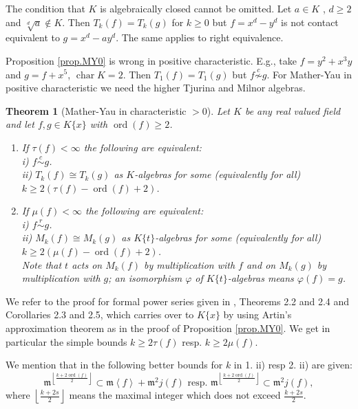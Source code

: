\documentclass[11pt]{article}
\DeclareMathOperator{\ord}{ord}
\DeclareMathOperator{\Char}{char}
\newtheorem{Theorem}[Definition]{Theorem}
\begin{document}
 {The condition that $K$ is algebraically closed cannot be omitted. Let $a \in K$ , $d \ge 2$ and $\sqrt[d]{a} \notin K$. Then  $T_k(f)=T_k(g)$ for $k\ge 0$ but
$f=x^d-y^d$ is not contact equivalent to $g=x^d-ay^d$. The same applies to right equivalence.}

Proposition \ref{prop.MY0} is wrong in positive characteristic. E.g., take $f=y^2+x^3y$ and $g=f+x^5$, $\Char K=2$. Then $T_1(f)=T_1(g)$ but $f\mathop{\not\sim}\limits^{c} g$. 
 {For Mather-Yau in positive characteristic} we need the higher Tjurina and Milnor algebras.

\begin{Theorem}[Mather-Yau in characteristic $>0$] \label{thm.MYp}
Let $K$ be any real valued field and let $f,g\in K \{x\}$ with $\ord(f) \ge 2$.
\begin{enumerate}
\item If $\tau(f)<\infty$ the following are equivalent:\\
i) $f\mathop  \sim \limits^c g$. \\
ii) $T_k(f)  \cong T_k(g)$ as $K$-algebras for some (equivalently for all) $k\ge2(\tau(f)-\ord(f)+2)$.
\item If $\mu(f)<\infty$ the following are equivalent:\\
i) $f\mathop  \sim \limits^r g$. \\
ii) $M_k(f)  \cong M_k(g)$ as $K\{t\}$-algebras for some (equivalently for all) $k\ge2(\mu(f)-\ord(f)+2)$.\\ Note that $t$ acts on $M_k(f)$ by multiplication with $f$ and on  $M_k(g)$ by multiplication with $g$; an isomorphism $\varphi$ of $K\{t\}$-algebras means    $\varphi(f)=g$.
\end{enumerate}
\end{Theorem}

We refer  to the proof for formal power series given in \cite{GPh}, Theorems 2.2 and 2.4 and Corollaries 2.3 and 2.5, which carries over to $K\{x\}$  {by using Artin's approximation theorem as in the proof of Proposition \ref{prop.MY0}}. We get in particular the simple bounds $k\ge2\tau(f)$ resp. $k\ge2\mu(f)$.

We mention that in \cite[Theorems 2.2, resp. Theorems 2.4]{GPh} the following better bounds for $k$  {in 1. ii) resp 2. ii)} are given:
 $$\mathfrak{m}^{\left\lfloor {\frac{{k + 2\ord(f)}}{2}} \right\rfloor}\subset\mathfrak{m}\left\langle f \right\rangle +\mathfrak{m}^2{{j}}(f)
\text{ resp. } \mathfrak{m}^{\left\lfloor {\frac{{k + 2\ord(f)}}{2}} \right\rfloor}\subset\mathfrak{m}^2{ {j}}(f),$$
\noindent where ${\left\lfloor {\frac{{k + 2s}}{2}} \right\rfloor}$ means the maximal integer which does not exceed $\frac{{k + 2s}}{2}$.
\end{document}
